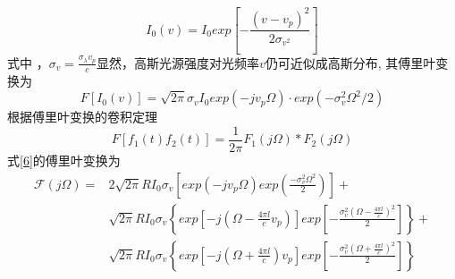 \begin{equation}
I_{0}(v)=I_{0}exp\left[-\frac{(v-v_{p})^{2}}{2\sigma_{v^{2}}} \right ]
\end{equation}
式中 ，$\sigma_{v}=\frac{\sigma_{\lambda}v_{p}}{c}$显然，高斯光源强度对光频率$v$仍可近似成高斯分布, 其傅里叶变换为
\begin{equation}
F\left[I_{0}(v) \right ]=\sqrt{2\pi}\sigma_{v}I_{0}exp(-jv_{p}\Omega)\cdot exp(-\sigma_{v}^{2}\Omega^{2}/2)
\end{equation}
根据傅里叶变换的卷积定理
\begin{equation}
F\left[f_{1}(t)f_{2}(t) \right ]=\frac{1}{2\pi}F_{1}(j\Omega)*F_{2}(j\Omega)
\end{equation}
式\ref{6}的傅里叶变换为
\begin{equation}
\begin{aligned}
 \mathscr{F}(j\Omega)=&2\sqrt{2\pi}RI_{0}\sigma_{v}\left[exp(-jv_{p}\Omega)exp(\frac{-\sigma_{v}^{2}\Omega^{2}}{2}) \right ]+ \\ 
 &  \sqrt{2\pi}RI_{0}\sigma_{v}\left\{exp\left[-j(\Omega-\frac{4\pi l}{c}v_{p}) \right ]exp\left[-\frac{\sigma^{2}_{v}(\Omega-\frac{4\pi l}{c})^{2}}{2} \right ] \right\}+ \\ 
 &  \sqrt{2\pi}RI_{0}\sigma_{v}\left\{exp\left[-j(\Omega+\frac{4\pi l}{c})v_{p} \right ]exp\left[-\frac{\sigma^{2}_{v}(\Omega+\frac{4\pi l}{c})^{2}}{2} \right ] \right\}
\end{aligned}
\end{equation}
